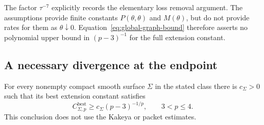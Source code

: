 The factor $\tau^{-7}$ explicitly records the elementary loss
removal argument.  The assumptions provide finite constants
$P(\theta,\theta)$ and $M(\theta)$, but do not provide rates for
them as $\theta\downarrow0$.  Equation~\eqref{eq:global-graph-bound}
therefore asserts no polynomial upper bound in $(p-3)^{-1}$ for
the full extension constant.

\subsection{A necessary divergence at the endpoint}

\begin{proposition}\label{prop:lower}
For every nonempty compact smooth surface $\Sigma$ in the stated
class there is $c_\Sigma>0$ such that its best extension constant
satisfies
\begin{equation}\label{eq:constant-lower-bound}
 C_{\Sigma,p}^{\mathrm{best}}
       \geq c_\Sigma(p-3)^{-1/p},\qquad 3<p\leq4.
\end{equation}
This conclusion does not use the Kakeya or packet estimates.
\end{proposition}

